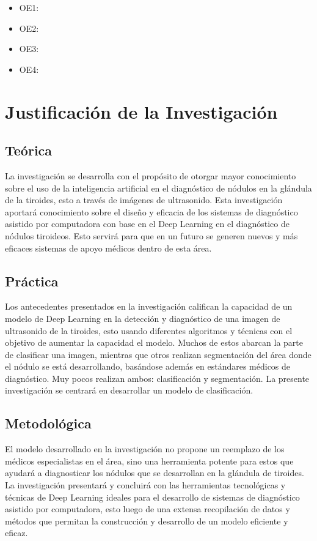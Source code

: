 \begin{itemize}
	\item OE1: {\Objone}
	\item OE2: {\Objtwo}
	\item OE3: {\Objthree}
	\item OE4: {\Objfour}
\end{itemize}



\section{Justificación de la Investigación}

\subsection{Teórica}
La investigación se desarrolla con el propósito de otorgar mayor conocimiento sobre el uso de la inteligencia artificial en el diagnóstico de nódulos en la glándula de la tiroides, esto a través de imágenes de ultrasonido. Esta investigación aportará conocimiento sobre el diseño y eficacia de los sistemas de diagnóstico asistido por computadora con base en el Deep Learning en el diagnóstico de nódulos tiroideos. Esto servirá para que en un futuro se generen nuevos y más eficaces sistemas de apoyo médicos dentro de esta área.

\subsection{Práctica}
Los antecedentes presentados en la investigación califican la capacidad de un modelo de Deep Learning en la detección y diagnóstico de una imagen de ultrasonido de la tiroides, esto usando diferentes algoritmos y técnicas con el objetivo de aumentar la capacidad el modelo. Muchos de estos abarcan la parte de clasificar una imagen, mientras que otros realizan segmentación del área donde el nódulo se está desarrollando, basándose además en estándares médicos de diagnóstico. Muy pocos realizan ambos: clasificación y segmentación. La presente investigación se centrará en desarrollar un modelo de clasificación. 

\subsection{Metodológica}
El modelo desarrollado en la investigación no propone un reemplazo de los médicos especialistas en el área, sino una herramienta potente para estos que ayudará a diagnosticar los nódulos que se desarrollan en la glándula de tiroides. La investigación presentará y concluirá con las herramientas tecnológicas y técnicas de Deep Learning ideales para el desarrollo de sistemas de diagnóstico asistido por computadora, esto luego de una extensa recopilación de datos y métodos que permitan la construcción y desarrollo de un modelo eficiente y eficaz.

